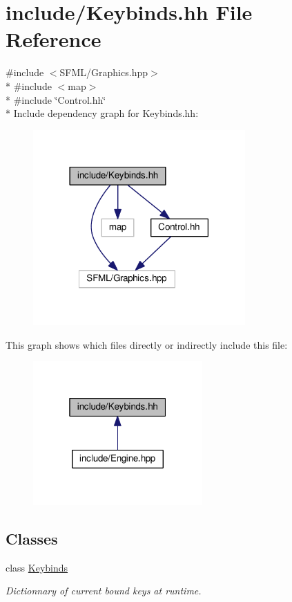 \hypertarget{Keybinds_8hh}{}\section{include/\+Keybinds.hh File Reference}
\label{Keybinds_8hh}
{\ttfamily \#include $<$S\+F\+M\+L/\+Graphics.\+hpp$>$}\\*
{\ttfamily \#include $<$map$>$}\\*
{\ttfamily \#include \char`\"{}Control.\+hh\char`\"{}}\\*
Include dependency graph for Keybinds.\+hh\+:
\nopagebreak
\begin{figure}[H]
\begin{center}
\leavevmode
\includegraphics[width=230pt]{Keybinds_8hh__incl}
\end{center}
\end{figure}
This graph shows which files directly or indirectly include this file\+:\nopagebreak
\begin{figure}[H]
\begin{center}
\leavevmode
\includegraphics[width=184pt]{Keybinds_8hh__dep__incl}
\end{center}
\end{figure}
\subsection*{Classes}
\begin{DoxyCompactItemize}
\item 
class \hyperlink{classKeybinds}{Keybinds}
\begin{DoxyCompactList}\small\item\em Dictionnary of current bound keys at runtime. \end{DoxyCompactList}\end{DoxyCompactItemize}
